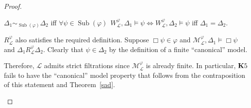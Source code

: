 \documentclass[a4paper]{article}
\theoremstyle{defin}
\theoremstyle{theorem}
\theoremstyle{prop}
\theoremstyle{lemma}
\theoremstyle{ex}
\theoremstyle{col}
\begin{document}
\begin{proof}
\begin{enumerate}
    \begin{center}
      $\Delta_1 \sim_{\operatorname{Sub}(\varphi)} \Delta_2$ iff $\forall \psi \in \operatorname{Sub}(\varphi) \:\: W_{\mathcal{L}}^{\varphi}, \Delta_1 \models \psi \Leftrightarrow W_{\mathcal{L}}^{\varphi}, \Delta_2 \models \psi$ iff $\Delta_1 = \Delta_2$.
    \end{center}

    $R_{\mathcal{L}}^{\varphi}$ also satisfies the required definition.
    Suppose $\Box \psi \in \varphi$ and
    $\mathcal{M}_{\mathcal{L}}^{\varphi}, \Delta_1 \models \Box \psi$ and
    $\Delta_1 R_{\mathcal{L}}^{\varphi} \Delta_2$. Clearly that $\psi \in \Delta_2$ by the definition
    of a finite ``canonical'' model.

    Therefore, $\mathcal{L}$ admits strict filtrations since $\mathcal{M}_{\mathcal{L}}^{\varphi}$ is already finite. In particular, ${\bf K}5$ fails to have the ``canonical'' model property that follows from the contraposition of this statement and Theorem~\ref{sad}.

  \end{enumerate}
\end{proof}




\end{document}
